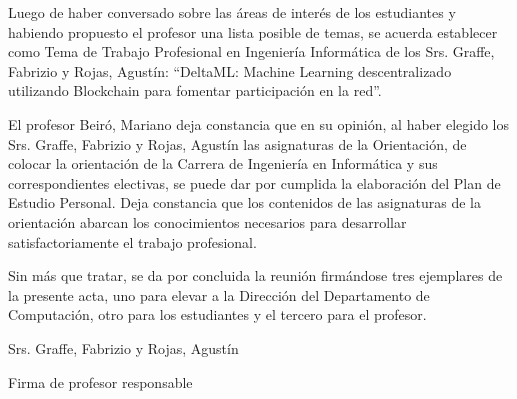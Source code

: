 \documentclass[
11pt, %
oneside, %
spanish, %
singlespacing, %
headsepline, %
chapterinoneline, %
]{MastersDoctoralThesis} %
\begin{document}
\justify
Luego de haber conversado sobre las áreas de interés de los estudiantes y habiendo propuesto el profesor una lista posible de temas, se acuerda establecer como Tema de Trabajo Profesional en Ingeniería Informática de los Srs. Graffe, Fabrizio y Rojas, Agustín: “DeltaML: Machine Learning descentralizado utilizando Blockchain para fomentar participaci\'on en la red”.

\justify
El profesor Beiró, Mariano deja constancia que en su opinión, al haber elegido los Srs. Graffe, Fabrizio y Rojas, Agustín las asignaturas de la Orientación, de colocar la orientación de la Carrera de Ingeniería en Informática y sus correspondientes electivas, se puede dar por cumplida la elaboración del Plan de Estudio Personal. Deja constancia que los contenidos de las asignaturas de la orientación abarcan los conocimientos necesarios para desarrollar satisfactoriamente el trabajo profesional.

\justify
Sin más que tratar, se da por concluida la reunión firmándose tres ejemplares de la presente acta, uno para elevar a la Dirección del Departamento de Computación, otro para los estudiantes y el tercero para el profesor. \\

\raggedright
Srs. Graffe, Fabrizio y Rojas, Agustín \\
\raggedright
Firma de profesor responsable

\end{document}
